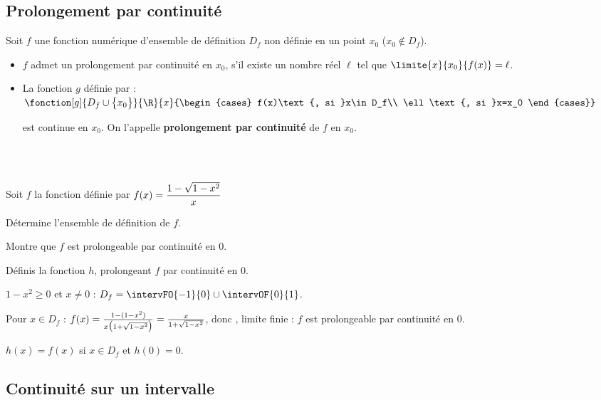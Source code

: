 \subsection{Prolongement par continuité}
\begin{definition}
Soit $f$ une fonction numérique d'ensemble de définition $D_f$ non définie en un point $x_0$ \big($x_0\notin D_f$\big).
\begin{itemize}
\item $f$ admet un prolongement par continuité en $x_0$, s'il existe un nombre réel $\ell$ tel que $\limite{x}{x_0}{f(x)}=\ell$.
\item La fonction $g$ définie par : $\fonction[g]{D_f\cup\big\{x_0\big\}}{\R}{x}{\begin{cases}
	f(x)\text{, si }x\in D_f\\
	\ell\text{, si }x=x_0
	\end{cases}}$
\par est continue en $x_0$. On l'appelle \textbf{prolongement par continuité} de $f$ en $x_0$.
\end{itemize}
\end{definition}\\\\
\fi %
\begin{exemple}
Soit $f$ la fonction définie par $f(x)=\dfrac{1-\sqrt{1-x^2}}{x}$
\be \item Détermine l'ensemble de définition de $f$.
\item \be \item Montre que $f$ est prolongeable par continuité en $0$.
\item Définis la fonction $h$, prolongeant $f$ par continuité en $0$.\ee\ee
\end{exemple}
\begin{corrigeprof}[8]
\be
\item $1-x^2\geq 0$ et $x\neq 0$ : $D_f=\intervFO{-1}{0}\cup\intervOF{0}{1}$.
\item \be \item Pour $x\in D_f$ : $f(x)=\frac{1-(1-x^2)}{x\big(1+\sqrt{1-x^2}\big)}=\frac{x}{1+\sqrt{1-x^2}}$, donc , limite finie : $f$ est prolongeable par continuité en $0$.
	\item $h(x)=f(x)$ si $x\in D_f$ et $h(0)=0$.\ee
\ee
\end{corrigeprof}
\vspace*{-1cm}
\ifenseignant %
\subsection{Continuité sur un intervalle}

